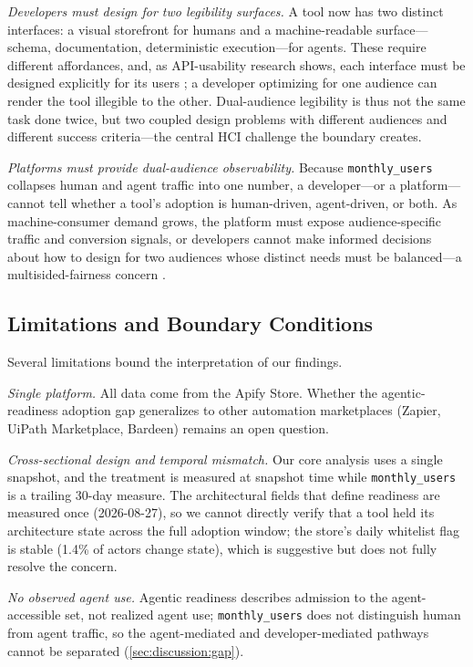 \emph{Developers must design for two legibility surfaces.} A tool now has two
distinct interfaces: a visual storefront for humans and a machine-readable
surface---schema, documentation, deterministic execution---for agents. These
require different affordances, and, as API-usability research shows, each
interface must be designed explicitly for its users \cite{myers2016api}; a
developer optimizing for one audience can render the tool illegible to the
other. Dual-audience
legibility is thus not the same task done twice, but two coupled design problems
with different audiences and different success criteria---the central HCI
challenge the boundary creates.

\emph{Platforms must provide dual-audience observability.} Because
\texttt{monthly\_users} collapses human and agent traffic into one number, a
developer---or a platform---cannot tell whether a tool's adoption is
human-driven, agent-driven, or both. As machine-consumer demand grows, the
platform must expose audience-specific traffic and conversion signals, or
developers cannot make informed decisions about how to design for two audiences
whose distinct needs must be balanced---a multisided-fairness concern
\cite{burke2017multisided}.

\subsection{Limitations and Boundary Conditions}
\label{sec:discussion:limitations}

Several limitations bound the interpretation of our findings.

\emph{Single platform.} All data come from the Apify Store. Whether the
agentic-readiness adoption gap generalizes to other automation marketplaces
(Zapier, UiPath Marketplace, Bardeen) remains an open question.

\emph{Cross-sectional design and temporal mismatch.} Our core analysis uses a
single snapshot, and the treatment is measured at snapshot time while
\texttt{monthly\_users} is a trailing 30-day measure. The architectural fields
that define readiness are measured once (2026-08-27), so we cannot directly
verify that a tool held its architecture state across the full adoption window;
the store's daily whitelist flag is stable (1.4\% of actors change state), which
is suggestive but does not fully resolve the concern.

\emph{No observed agent use.} Agentic readiness describes admission to the
agent-accessible set, not realized agent use; \texttt{monthly\_users} does not
distinguish human from agent traffic, so the agent-mediated and
developer-mediated pathways cannot be separated (\autoref{sec:discussion:gap}).

